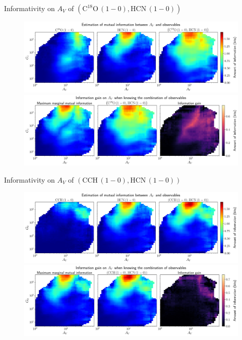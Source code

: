 \documentclass{beamer}
\begin{document}
\begin{frame}{Informativity on $A_V$ of $\left(\mathrm{C^{18}O\,(1-0)},\mathrm{HCN\,(1-0)}\right)$}
    \begin{figure}
        \centering
        \includegraphics[width=0.95\linewidth]{../mi/av__c18o10_hcn10_mi.png}
        \vfill
        \includegraphics[width=0.95\linewidth]{../mi/av__c18o10_hcn10_mi_gain.png}
    \end{figure}
\end{frame}

\begin{frame}{Informativity on $A_V$ of $\left(\mathrm{CCH\,(1-0)},\mathrm{HCN\,(1-0)}\right)$}
    \begin{figure}
        \centering
        \includegraphics[width=0.95\linewidth]{../mi/av__cch10_hcn10_mi.png}
        \vfill
        \includegraphics[width=0.95\linewidth]{../mi/av__cch10_hcn10_mi_gain.png}
    \end{figure}
\end{frame}
\end{document}
